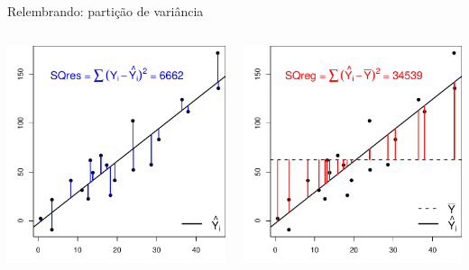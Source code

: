 \documentclass{beamer}\usepackage[]{graphicx}\usepackage[]{color}
\newenvironment{knitrout}{}{} %
\renewenvironment{knitrout}{\setlength{\topsep}{0mm}}{}
\begin{document}
\begin{frame}{Relembrando: partição de variância}
\begin{columns}[c]
\begin{knitrout}
\color{fgcolor}
\includegraphics[width=1.1\linewidth]{figure/plotsqE-1} 

\end{knitrout}

\pause


\begin{knitrout}
\color{fgcolor}
\includegraphics[width=1.1\linewidth]{figure/plotsqr-1} 

\end{knitrout}

\end{columns}

\end{frame}
\end{document}
